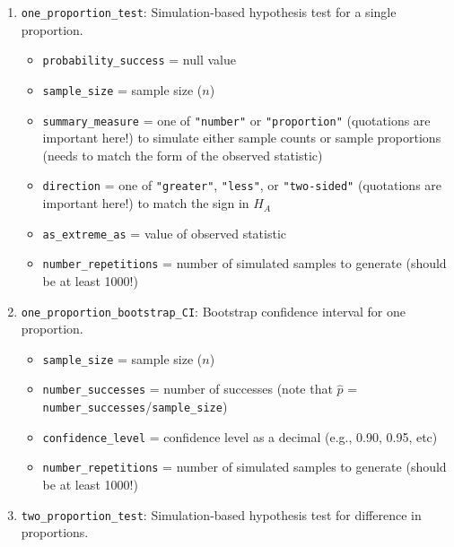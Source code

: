 \documentclass[
  10pt,
  openany]{book}
\providecommand{\tightlist}{%
  \setlength{\itemsep}{0pt}\setlength{\parskip}{0pt}}
\theoremstyle{definition}
\theoremstyle{definition}
\theoremstyle{definition}
\theoremstyle{definition}
\theoremstyle{remark}
\begin{document}
\begin{enumerate}
\def\labelenumi{\arabic{enumi}.}
\item
  \texttt{one\_proportion\_test}: Simulation-based hypothesis test for a single proportion.

  \begin{itemize}
  \tightlist
  \item
    \texttt{probability\_success} = null value
  \item
    \texttt{sample\_size} = sample size (\(n\))
  \item
    \texttt{summary\_measure} = one of \texttt{"number"} or \texttt{"proportion"} (quotations are important here!) to simulate either sample counts or sample proportions (needs to match the form of the observed statistic)\\
  \item
    \texttt{direction} = one of \texttt{"greater"}, \texttt{"less"}, or \texttt{"two-sided"} (quotations are important here!) to match the sign in \(H_A\)
  \item
    \texttt{as\_extreme\_as} = value of observed statistic
  \item
    \texttt{number\_repetitions} = number of simulated samples to generate (should be at least 1000!)
  \end{itemize}
\item
  \texttt{one\_proportion\_bootstrap\_CI}: Bootstrap confidence interval for one proportion.

  \begin{itemize}
  \tightlist
  \item
    \texttt{sample\_size} = sample size (\(n\))
  \item
    \texttt{number\_successes} = number of successes (note that \(\hat{p}\) = \texttt{number\_successes}/\texttt{sample\_size})
  \item
    \texttt{confidence\_level} = confidence level as a decimal (e.g., 0.90, 0.95, etc)
  \item
    \texttt{number\_repetitions} = number of simulated samples to generate (should be at least 1000!)
  \end{itemize}
\item
  \texttt{two\_proportion\_test}: Simulation-based hypothesis test for difference in proportions.


\end{enumerate}
\end{document}
